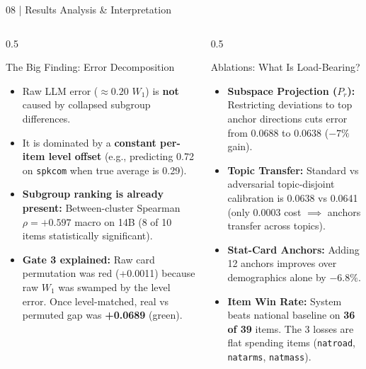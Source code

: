 \documentclass[10pt,aspectratio=169]{beamer}
\begin{document}
\begin{frame}{08 | Results Analysis \& Interpretation}
    \scriptsize
    \begin{columns}[T]
        \begin{column}{0.5\textwidth}
            \begin{block}{The Big Finding: Error Decomposition}
                \tiny
                \begin{itemize}\itemsep3pt
                    \item Raw LLM error ($\approx 0.20$ $W_1$) is \textbf{not} caused by collapsed subgroup differences.
                    \item It is dominated by a \textbf{constant per-item level offset} (e.g., predicting 0.72 on \texttt{spkcom} when true average is 0.29).
                    \item \textbf{Subgroup ranking is already present:} Between-cluster Spearman $\rho = \mathbf{+0.597}$ macro on 14B (8 of 10 items statistically significant).
                    \item \textbf{Gate 3 explained:} Raw card permutation was red (+0.0011) because raw $W_1$ was swamped by the level error. Once level-matched, real vs permuted gap was \textbf{+0.0689} (green).
                \end{itemize}
            \end{block}
        \end{column}
        \begin{column}{0.5\textwidth}
            \begin{block}{Ablations: What Is Load-Bearing?}
                \tiny
                \begin{itemize}\itemsep3pt
                    \item \textbf{Subspace Projection ($P_r$):} Restricting deviations to top anchor directions cuts error from 0.0688 to 0.0638 ($-7\%$ gain).
                    \item \textbf{Topic Transfer:} Standard vs adversarial topic-disjoint calibration is 0.0638 vs 0.0641 (only 0.0003 cost $\implies$ anchors transfer across topics).
                    \item \textbf{Stat-Card Anchors:} Adding 12 anchors improves over demographics alone by $-6.8\%$.
                    \item \textbf{Item Win Rate:} System beats national baseline on \textbf{36 of 39} items. The 3 losses are flat spending items (\texttt{natroad}, \texttt{natarms}, \texttt{natmass}).
                \end{itemize}
            \end{block}
        \end{column}
    \end{columns}
\end{frame}
\end{document}
